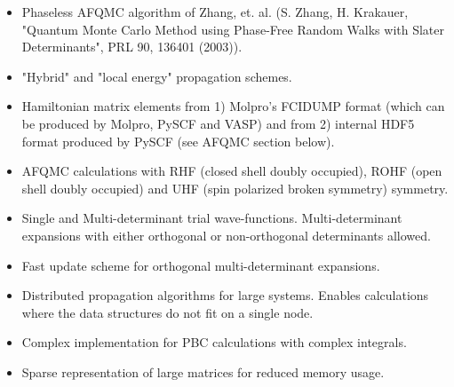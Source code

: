 \begin{itemize}
    \item Phaseless AFQMC algorithm of Zhang, et. al. (S. Zhang, H. Krakauer, "Quantum Monte Carlo Method using Phase-Free Random Walks with Slater Determinants", PRL 90, 136401 (2003)).
    \item "Hybrid" and "local energy" propagation schemes.
    \item Hamiltonian matrix elements from 1) Molpro's FCIDUMP format (which can be produced by Molpro, PySCF and VASP) and from 2) internal HDF5 format produced by PySCF (see AFQMC section below).
    \item AFQMC calculations with RHF (closed shell doubly occupied), ROHF (open shell doubly occupied) and UHF (spin polarized broken symmetry) symmetry. 
    \item Single and Multi-determinant trial wave-functions. Multi-determinant expansions with either orthogonal or non-orthogonal determinants allowed. 
    \item Fast update scheme for orthogonal multi-determinant expansions.
    \item Distributed propagation algorithms for large systems. Enables calculations where the data structures do not fit on a single node.
    \item Complex implementation for PBC calculations with complex integrals.
    \item Sparse representation of large matrices for reduced memory usage.
\end{itemize}
